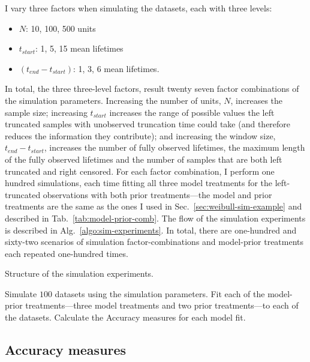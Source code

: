 I vary three factors when simulating the datasets, each with three levels:
\begin{itemize}
    \item[] $N$: 10, 100, 500 units
    \item[] $t_{start}$: 1, 5, 15 mean lifetimes
    \item[] $(t_{end} - t_{start})$: 1, 3, 6 mean lifetimes.
\end{itemize}
In total, the three three-level factors, result twenty seven factor combinations of the simulation parameters. Increasing the number of units, $N$, increases the sample size; increasing $t_{start}$ increases the range of possible values the left truncated samples with unobserved truncation time could take (and therefore reduces the information they contribute); and increasing the window size, $t_{end} - t_{start}$, increases the number of fully observed lifetimes, the maximum length of the fully observed lifetimes and the number of samples that are both left truncated and right censored. For each factor combination, I perform one hundred simulations, each time fitting all three model treatments for the left-truncated observations with both prior treatments---the model and prior treatments are the same as the ones I used in Sec.~\ref{sec:weibull-sim-example} and described in Tab.~\ref{tab:model-prior-comb}. The flow of the simulation experiments is described in Alg.~\ref{algo:sim-experiments}. In total, there are one-hundred and sixty-two scenarios of simulation factor-combinations and model-prior treatments each repeated one-hundred times.

\begin{algorithm}
	\caption{Structure of the simulation experiments.}
  \label{algo:sim-experiments}
	\begin{algorithmic}[1]
    \State Simulate $100$ datasets using the simulation parameters.
    \State Fit each of the model-prior treatments---three model treatments and two prior treatments---to each of the datasets.
    \State Calculate the Accuracy measures for each model fit.
    \EndFor
	\end{algorithmic} 
\end{algorithm} 

\subsection{Accuracy measures} \label{subsec:accuracy-measures}

